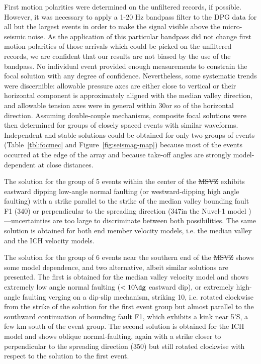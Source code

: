 \documentclass[jgr]{agu2001}
\newlength{\tw}
\providecommand{\DIFadd}[1]{{\protect\color{blue}\uwave{#1}}} %
\providecommand{\DIFdel}[1]{{\protect\color{red}\sout{#1}}}                      %
\providecommand{\DIFaddbegin}{} %
\providecommand{\DIFaddend}{} %
\providecommand{\DIFdelbegin}{} %
\providecommand{\DIFdelend}{} %
\begin{document}
\begin{article}
First motion polarities were determined on the unfiltered records, if
possible.  However, it was necessary to apply a 1-20 Hz bandpass
filter to the DPG data for
all but the largest events in order to make the signal visible above
the micro-seismic noise. As the application of this particular bandpass did not
change first motion polarities of those arrivals which could be picked on
the unfiltered records, we are confident that our results are not
biased by the use of the bandpass.  
No individual event provided enough measurements to constrain the
focal solution with any degree of confidence. Nevertheless, some
systematic trends were discernible:  allowable pressure
axes are either close to vertical or their horizontal component is approximately aligned with the
median valley direction, and allowable tension axes were in general within
30\dg or so of the horizontal direction.  Assuming double-couple
mechanisms, composite focal solutions
were then determined for groups of closely spaced events with similar
waveforms.   Independent and stable solutions could be obtained for
only two groups of events (Table~\ref{tbl:focmec} and Figure~\ref{fig:seismag-map})
because most of the events occurred at the edge of the array and
because take-off angles are strongly
model-dependent at close distances.

The solution for the group of 5 events within the center of the
\DIFdelbegin \DIFdel{MSVZ }\DIFdelend \DIFaddbegin \DIFadd{MVSZ }\DIFaddend exhibits eastward dipping low-angle normal
faulting (or westward-dipping high angle faulting)
with a strike parallel to the strike of the median valley bounding
fault F1 (340\dg) or perpendicular to the spreading direction (347\dg in
the Nuvel-1 model \citep{demets90})---uncertainties are too large to
discriminate between both possibilities.
The same solution is obtained for both end member velocity models,
i.e. the median valley and the ICH velocity models.

The solution for the group of 6 events near the southern end of
the \DIFdelbegin \DIFdel{MSVZ }\DIFdelend \DIFaddbegin \DIFadd{MVSZ }\DIFaddend shows some model dependence, and two alternative, albeit similar
solutions are presented.  The first is obtained for the median valley
velocity model and shows extremely low angle normal faulting ($<10\dg$
eastward dip), or extremely high-angle faulting verging on a dip-slip
mechanism, striking 10\dg, i.e. rotated clockwise from the strike of
the solution for the first event group but almost parallel to the southward continuation
of bounding fault F1, which exhibits a kink near 5'S,  a few km south of the
event group.  The second solution is obtained for the ICH model and
shows oblique normal-faulting, again with a strike closer to
perpendicular to the spreading direction (350\dg) but still rotated
clockwise with respect to the  solution to the first event.


\end{article}
\end{document}
